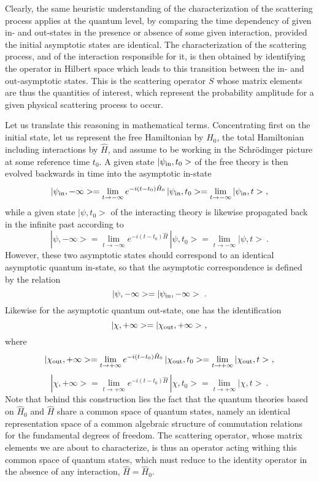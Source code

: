 \documentclass[a4paper,11pt]{article}
\begin{document}
Clearly, the same heuristic understanding of the characterization of the
scattering process applies at the quantum level, by comparing the time
dependency of given in- and out-states in the presence or absence of some
given interaction, provided the initial asymptotic states are identical. The 
characterization of the scattering process, and of the interaction 
responsible for it, is then obtained by identifying the operator in Hilbert 
space which leads to this transition between the in- and out-asymptotic 
states. This is the scattering operator $S$ whose matrix elements are thus 
the quantities of interest, which represent the probability amplitude for 
a given physical scattering process to occur.

Let us translate this reasoning in mathematical terms. Concentrating first on 
the initial state, let us represent the free Hamiltonian by $\hat{H}_0$, 
the total Hamiltonian including interactions by $\hat{H}$, and assume to be
working in the Schr\"odinger picture at some reference time $t_0$.
A given state $|\psi_{\rm in},t_0>$ of the free theory is then evolved
backwards in time into the asymptotic in-state
\begin{equation}
|\psi_{\rm in},-\infty>=
\lim_{t\rightarrow -\infty}e^{-i(t-t_0)\hat{H}_0}\,|\psi_{\rm in},t_0>=
\lim_{t\rightarrow -\infty}|\psi_{\rm in},t>\ ,
\end{equation}
while a given state $|\psi,t_0>$ of the interacting theory is likewise
propagated back in the infinite past according to
\begin{equation}
|\psi,-\infty>=
\lim_{t\rightarrow -\infty}e^{-i(t-t_0)\hat{H}}\,|\psi,t_0>=
\lim_{t\rightarrow -\infty}|\psi,t>\ .
\end{equation}
However, these two asymptotic states should correspond to an identical
asymptotic quantum in-state, so that the asymptotic correspondence is
defined by the relation
\begin{equation}
|\psi,-\infty>=|\psi_{\rm in},-\infty>\ .
\end{equation}
Likewise for the asymptotic quantum out-state, one has the identification
\begin{equation}
|\chi,+\infty>=|\chi_{\rm out},+\infty>\ ,
\end{equation}
where
\begin{equation}
|\chi_{\rm out},+\infty>=
\lim_{t\rightarrow +\infty}e^{-i(t-t_0)\hat{H}_0}\,|\chi_{\rm out},t_0>=
\lim_{t\rightarrow +\infty}|\chi_{\rm out},t>\ ,
\end{equation}
\begin{equation}
|\chi,+\infty>=
\lim_{t\rightarrow +\infty}e^{-i(t-t_0)\hat{H}}\,|\chi,t_0>=
\lim_{t\rightarrow +\infty}|\chi,t>\ .
\end{equation}
Note that behind this construction lies the fact that the quantum theories
based on $\hat{H}_0$ and $\hat{H}$ share a common space of quantum states,
namely an identical representation space of a common algebraic structure
of commutation relations for the fundamental degrees of freedom. The scattering
operator, whose matrix elements we are about to characterize, is thus an
operator acting withing this common space of quantum states, which must 
reduce to the identity operator in the absence of any interaction, 
$\hat{H}=\hat{H}_0$.
\end{document}
